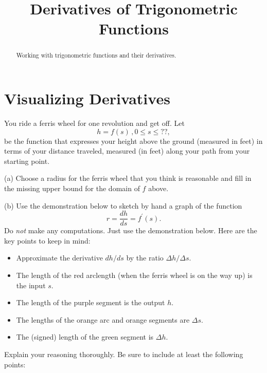 \documentclass{ximera}
\title{Derivatives of Trigonometric Functions}
\begin{document}
\begin{abstract}
Working with trigonometric functions and their derivatives.
\end{abstract}
\maketitle



\section{Visualizing Derivatives}
\begin{question}  \label{Qdfgtt5ttt55}

You ride a ferris wheel for one revolution and get off. Let 
\[
    h = f(s) \, , 0\leq s \leq ??,
\]
be the function that expresses your height above the ground (measured in feet) in terms of your distance traveled, measured (in feet) along your path from your starting point.

(a) Choose a radius for the ferris wheel that you think is reasonable and fill in the missing upper bound for the domain of $f$ above.

(b) Use the demonstration below to sketch by hand a graph of the function 
\[
     r = \frac{dh}{ds} = f^\prime(s) .
\] 
Do \emph{not} make any computations. Just use the demonstration below. Here are the key points to keep in mind:

\begin{itemize}
\item{Approximate the derivative $dh/ds$ by the ratio $\Delta h / \Delta s$}.

\item{The length of the red arclength (when the ferris wheel is on the way up) is the input $s$. }

\item{The length of the purple segment is the output $h$.}

\item{The lengths of the orange arc and orange segments are $\Delta s$.}

\item{The (signed) length of the green segment is  $\Delta h$.}

\end{itemize}




Explain your reasoning thoroughly. Be sure to include at least the following points:


\end{question}
\end{document}
